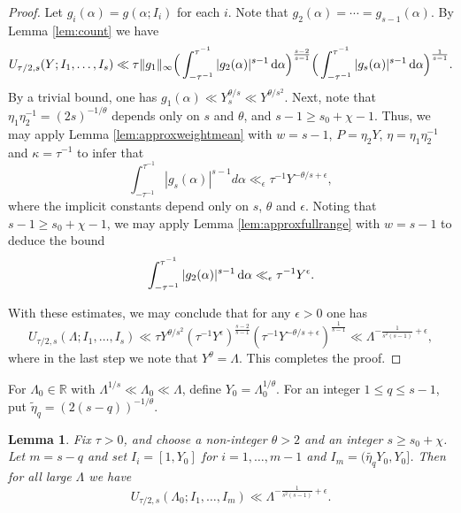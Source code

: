 \documentclass[11pt,reqno]{amsart}
\numberwithin{equation}{section}
\newtheorem{lemma}{Lemma}[section]
\renewcommand{\d}{\,{\rm d}}
\begin{document}
\begin{proof} Let $g_i(\alpha) = g(\alpha;I_i)$ for each $i$. Note that $g_2(\alpha) = \cdots = g_{s-1}(\alpha)$. By Lemma \ref{lem:count} we have 
\[ U_{\tau/2,s}(Y; I_1,\ldots, I_s) \ll \tau \| g_1\|_{\infty} \Big( \int_{-\tau^{-1}}^{\tau^{-1}} |g_2(\alpha)|^{s-1}\d\alpha \Big)^{\frac{s-2}{s-1}}\Big( \int_{-\tau^{-1}}^{\tau^{-1}} |g_s(\alpha)|^{s-1}\d\alpha \Big)^{\frac{1}{s-1}}. \]
By a trivial bound, one has $g_1(\alpha) \ll Y_s^{\theta/s} \ll Y^{\theta/s^2}$.
Next, note that 
$\eta_1\eta_2^{-1} = (2s)^{-1/\theta} $ depends only on $s$ and $\theta$, and $s-1 \geq s_0+\chi-1$. Thus, we may apply Lemma \ref{lem:approxweightmean} with $w = s-1$, $P = \eta_2Y$, $\eta = \eta_1\eta_2^{-1}$ and $\kappa = \tau^{-1}$ to infer that 
\[ \int_{-\tau^{-1}}^{\tau^{-1}} |g_s(\alpha)|^{s-1}d\alpha  \ll_{\epsilon} \tau^{-1}Y^{-\theta/s+\epsilon}, \] 
where the implicit constants depend only on $s$, $\theta$ and $\epsilon$. Noting that $s-1 \geq s_0+\chi-1$, we may apply Lemma \ref{lem:approxfullrange} with $w = s-1$ to deduce the bound 
\[ \int_{-\tau^{-1}}^{\tau^{-1}} |g_2(\alpha)|^{s-1}\d\alpha \ll_{\epsilon} \tau^{-1}Y^{\epsilon}. \]

With these estimates, we may conclude that for any $\epsilon > 0$ one has 
\[ U_{\tau/2,s}(\Lambda; I_1,\ldots, I_s) \ll \tau Y^{\theta/s^2} (\tau^{-1}Y^{\epsilon})^{\frac{s-2}{s-1}}(\tau^{-1}Y^{-\theta/s+\epsilon})^{\frac{1}{s-1}} \ll \Lambda^{-\frac{1}{s^2(s-1)}+\epsilon}, \]
where in the last step we note that $Y^\theta = \Lambda$. This completes the proof. 
\end{proof}

For $\Lambda_0 \in \mathbb{R}$ with $\Lambda^{1/s} \ll \Lambda_0 \ll \Lambda$, 
define $Y_0 = \Lambda_0^{1/\theta}$. For an integer $1 \leq q \leq s-1$, put $\tilde{\eta}_q = (2(s-q))^{-1/\theta}$. 
\begin{lemma} \label{lem:approxderivmean}
Fix $\tau > 0$, and choose a non-integer $\theta > 2$ and an integer $s \geq s_0+\chi$. Let $m = s-q$ and set $I_i = [1,Y_0]$ for $i = 1,\ldots,m-1$ and $I_m = (\tilde{\eta_q}Y_0,Y_0] $. Then for all large $\Lambda$ we have 
\[ U_{\tau/2,s}(\Lambda_0;I_1,\ldots,I_m) \ll \Lambda^{-\frac{1}{s^2(s-1)}+\epsilon}. \]
\end{lemma}
\end{document}

